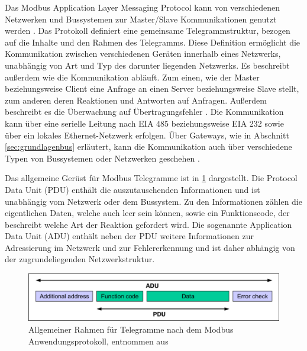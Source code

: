 Das Modbus Application Layer Messaging Protocol kann von verschiedenen Netzwerken und Bussystemen zur Master/Slave Kommunikationen genutzt werden \cite[S.~2f.]{mod12}.
Das Protokoll definiert eine gemeinsame Telegrammstruktur, bezogen auf die Inhalte und den Rahmen des Telegramms. Diese Definition ermöglicht die Kommunikation zwischen verschiedenen Geräten innerhalb eines Netzwerks, unabhängig von Art und Typ des darunter liegenden Netzwerks. Es beschreibt außerdem wie die Kommunikation abläuft. Zum einen, wie der Master beziehungsweise Client eine Anfrage an einen Server beziehungsweise Slave stellt, zum anderen deren Reaktionen und Antworten auf Anfragen. Außerdem beschreibt es die Überwachung auf Übertragungsfehler \cite[S.~2f.]{mod96}.
Die Kommunikation kann über eine serielle Leitung nach EIA 485 beziehungsweise EIA 232 sowie über ein lokales Ethernet-Netzwerk erfolgen. Über Gateways, wie in Abschnitt \ref{sec:grundlagenbus} erläutert, kann die Kommunikation auch über verschiedene Typen von Bussystemen oder Netzwerken geschehen \cite[S.~3f.]{mod12}.

Das allgemeine Gerüst für Modbus Telegramme ist in \ref{fig:modbusframe} dargestellt. Die Protocol Data Unit (PDU) enthält die auszutauschenden Informationen und ist unabhängig vom Netzwerk oder dem Bussystem. Zu den Informationen zählen die eigentlichen Daten, welche auch leer sein können, sowie ein Funktionscode, der beschreibt welche Art der Reaktion gefordert wird. Die sogenannte Application Data Unit (ADU) enthält neben der PDU weitere Informationen zur Adressierung im Netzwerk und zur Fehlererkennung und ist daher abhängig von der zugrundeliegenden Netzwerkstruktur.

\begin{figure}
\centering
\includegraphics[width=\textwidth]{abbildungen/20160319_Modbusframe}
\caption[Allgemeiner Rahmen für Telegramme nach dem Modbus Anwendungsprotokoll]{Allgemeiner Rahmen für Telegramme nach dem Modbus Anwendungsprotokoll, entnommen aus \cite[S.~3]{mod12}}
\label{fig:modbusframe}
\end{figure}

